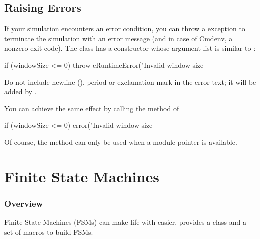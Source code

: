 \subsection{Raising Errors}

If your simulation encounters an error condition, you can throw a
 exception to terminate the simulation with
an error message (and in case of Cmdenv, a nonzero exit code).
The  class has a constructor whose argument list
is similar to :

\begin{cpp}
if (windowSize <= 0)
    throw cRuntimeError("Invalid window size %
\end{cpp}

Do not include newline (), period or exclamation mark
in the error text; it will be added by {\opp}.

You can achieve the same effect by calling the  method of

\begin{cpp}
if (windowSize <= 0)
    error("Invalid window size %
\end{cpp}

Of course, the  method can only be used when a module pointer
is available.



\section{Finite State Machines}
\label{sec:simple-modules:fsm}

\subsubsection{Overview}

Finite State Machines (FSMs)
can make life with  easier. {\opp} provides a
class and a set of macros to build FSMs.

